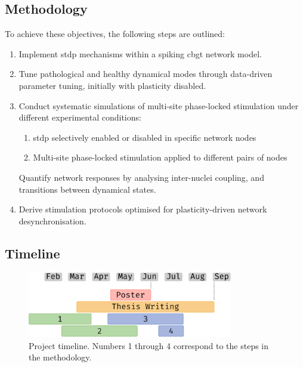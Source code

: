 \subsection{Methodology}
To achieve these objectives, the following steps are outlined:
\begin{enumerate}[nosep]
	\item Implement \acrshort{stdp} mechanisms within a spiking \acrshort{cbgt} network model.
	\item Tune pathological and healthy dynamical modes through data-driven parameter tuning, initially with plasticity disabled.
	\item Conduct systematic simulations of multi-site phase-locked stimulation under different experimental conditions:
	      \begin{enumerate}[nosep, label=\alph*.]
		      \item \acrshort{stdp} selectively enabled or disabled in specific network nodes
		      \item Multi-site phase-locked stimulation applied to different pairs of nodes
	      \end{enumerate}
	      Quantify network responses by analysing inter-nuclei coupling, and transitions between dynamical states.
	\item Derive stimulation protocols optimised for plasticity-driven network desynchronisation.
\end{enumerate}

\subsection{Timeline}
\begin{figure}[ht]
	\centering
	\includegraphics[width=0.8\textwidth]{figs/gant_chart.pdf}
	\caption{Project timeline. Numbers 1 through 4 correspond to the steps in the methodology.}
\end{figure}


\newpage


\newpage

